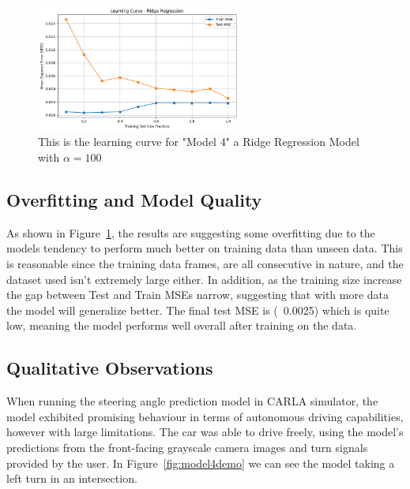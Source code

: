 \documentclass{article} %
\begin{document}
\begin{figure}[H] %
    \centering
    \includegraphics[width=0.6\textwidth]{model4learningcurve.png} %
    \caption{This is the learning curve for "Model 4" a Ridge Regression Model with $\alpha = 100$}
    \label{fig:model4learningcurve}
\end{figure}

\subsection{Overfitting and Model Quality}
As shown in Figure~\ref{fig:model4learningcurve}, the results are suggesting some overfitting due to the models tendency
to perform much better on training data than unseen data. This is reasonable since the training data frames, 
are all consecutive in nature, and the dataset used isn't extremely large either. In addition, as the training size
increase the gap between Test and Train MSEs narrow, suggesting that with more data the model will generalize better. 
The final test MSE is (~0.0025) which is quite low, meaning the model performs well overall after training on the data.


\subsection{Qualitative Observations}
When running the steering angle prediction model in CARLA simulator, the model exhibited promising behaviour in terms of
autonomous driving capabilities, however with large limitations. The car was able to drive freely, using the model's predictions
from the front-facing grayscale camera images and turn signals provided by the user. In Figure~\ref{fig:model4demo} we can see 
the model taking a left turn in an intersection.
\end{document}
